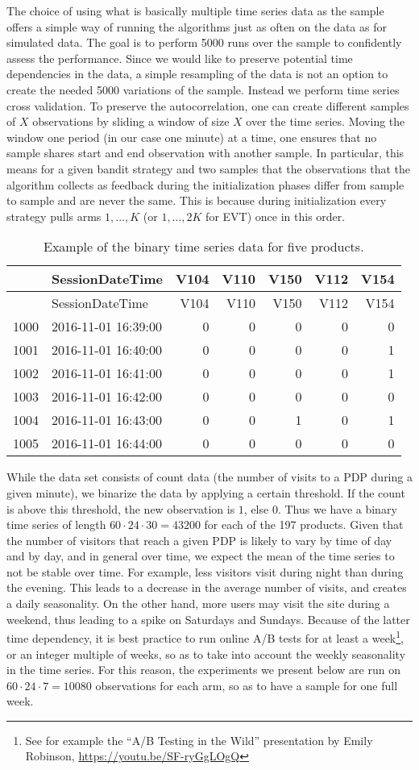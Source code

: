 \documentclass[11pt,]{article}
\let\rmarkdownfootnote\footnote%
\def\footnote{\protect\rmarkdownfootnote}
\begin{document}
The choice of using what is basically multiple time series data as the
sample offers a simple way of running the algorithms just as often on
the data as for simulated data. The goal is to perform 5000 runs over
the sample to confidently assess the performance. Since we would like to
preserve potential time dependencies in the data, a simple resampling of
the data is not an option to create the needed 5000 variations of the
sample. Instead we perform time series cross validation. To preserve the
autocorrelation, one can create different samples of \(X\) observations
by sliding a window of size \(X\) over the time series. Moving the
window one period (in our case one minute) at a time, one ensures that
no sample shares start and end observation with another sample. In
particular, this means for a given bandit strategy and two samples that
the observations that the algorithm collects as feedback during the
initialization phases differ from sample to sample and are never the
same. This is because during initialization every strategy pulls arms
\(1, ..., K\) (or \(1,...,2K\) for EVT) once in this order.

\begin{longtable}[]{@{}llrrrrr@{}}
\caption{Example of the binary time series data for five
products.}\tabularnewline
\toprule
& SessionDateTime & V104 & V110 & V150 & V112 & V154\tabularnewline
\midrule
\endfirsthead
\toprule
& SessionDateTime & V104 & V110 & V150 & V112 & V154\tabularnewline
\midrule
\endhead
1000 & 2016-11-01 16:39:00 & 0 & 0 & 0 & 0 & 0\tabularnewline
1001 & 2016-11-01 16:40:00 & 0 & 0 & 0 & 0 & 1\tabularnewline
1002 & 2016-11-01 16:41:00 & 0 & 0 & 0 & 0 & 1\tabularnewline
1003 & 2016-11-01 16:42:00 & 0 & 0 & 0 & 0 & 0\tabularnewline
1004 & 2016-11-01 16:43:00 & 0 & 0 & 1 & 0 & 1\tabularnewline
1005 & 2016-11-01 16:44:00 & 0 & 0 & 0 & 0 & 0\tabularnewline
\bottomrule
\end{longtable}

While the data set consists of count data (the number of visits to a PDP
during a given minute), we binarize the data by applying a certain
threshold. If the count is above this threshold, the new observation is
\(1\), else \(0\). Thus we have a binary time series of length
\(60\cdot 24 \cdot 30 = 43200\) for each of the 197 products. Given that
the number of visitors that reach a given PDP is likely to vary by time
of day and by day, and in general over time, we expect the mean of the
time series to not be stable over time. For example, less visitors visit
during night than during the evening. This leads to a decrease in the
average number of visits, and creates a daily seasonality. On the other
hand, more users may visit the site during a weekend, thus leading to a
spike on Saturdays and Sundays. Because of the latter time dependency,
it is best practice to run online A/B tests for at least a
week\footnote{See for example the ``A/B Testing in the Wild''
  presentation by Emily Robinson, \url{https://youtu.be/SF-ryGgLOgQ}},
or an integer multiple of weeks, so as to take into account the weekly
seasonality in the time series. For this reason, the experiments we
present below are run on \(60 \cdot 24 \cdot 7 = 10080\) observations
for each arm, so as to have a sample for one full week.
\end{document}

